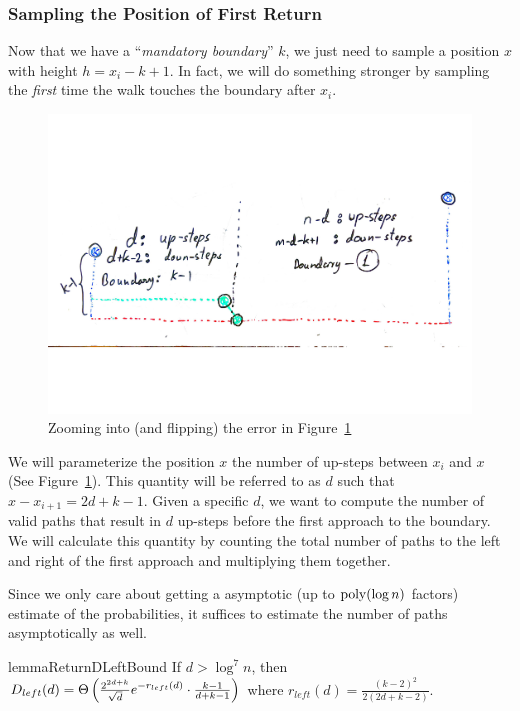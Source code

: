\subsubsection{Sampling the Position of First Return}%
\label{sec:sampling_the_location_of_first_return}
Now that we have a ``\emph{mandatory boundary}'' $k$, we just need to sample a position $x$ with height $h = x_i-k+1$.
In fact, we will do something stronger by sampling the \emph{first} time the walk touches the boundary after $x_i$.
\begin{figure}[htpb]
    \centering
    \includegraphics[width=1.0\linewidth, trim={0 6cm 0 5cm}]{images/dyck_return_sampling.pdf}
    \caption{Zooming into (and flipping) the error in Figure~\ref{fig:dyck_return_sampling}}
    \label{fig:dyck_return_sampling}
\end{figure}

We will parameterize the position $x$ the number of up-steps between $x_i$ and $x$
(See Figure~\ref{fig:dyck_return_sampling}).
This quantity will be referred to as $d$ such that $x - x_{i+1} = 2d + k-1$.
Given a specific $d$, we want to compute the number of valid paths that result in
$d$ up-steps before the first approach to the boundary.
We will calculate this quantity by counting the total number of paths to the left and right
of the first approach and multiplying them together.

Since we only care about getting a asymptotic (up to $\mathrm{poly}(\log n)$ factors) estimate of the probabilities,
it suffices to estimate the number of paths asymptotically as well.

\begin{restatable}{lemma}{ReturnDLeftBound}
\label{lem:ReturnDLeftBound}
If $d > \log^7 n$, then $D_{left}(d)
= \Theta\left( \frac{2^{2d+k}}{\sqrt{d}}\mathlarger e^{-r_{left}(d)}\cdot \frac{k-1}{d+k-1}\right)$
where $r_{left}(d) = \frac{(k-2)^2}{2(2d+k-2)}$.
\end{restatable}

